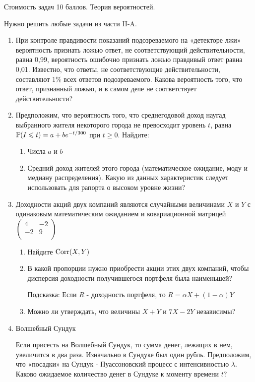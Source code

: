 \documentclass[12pt, a4paper]{article}\usepackage[]{graphicx}\usepackage[]{color}
\begin{document}
Стоимость задач 10 баллов. Теория вероятностей.

Нужно решить любые \textbf{} задачи из части II-A.

\begin{enumerate}
\item При контроле правдивости показаний подозреваемого на «детекторе лжи» вероятность признать ложью ответ, не соответствующий действительности, равна 0,99, вероятность ошибочно признать ложью правдивый ответ равна 0,01. Известно, что ответы, не соответствующие действительности, составляют 1\% всех ответов подозреваемого.
Какова вероятность того, что ответ, признанный ложью, и в самом деле не соответствует действительности?
\item Предположим, что вероятность того, что среднегодовой доход наугад выбранного жителя некоторого города не превосходит уровень $t$, равна $\P(I\le t)=a+be^{-t/300}$ при $t\ge 0$.
Найдите:
\begin{enumerate}
\item Числа $a$ и $b$
\item Средний доход жителей этого города (математическое ожидание, моду и медиану распределения). Какую из данных характеристик следует использовать для рапорта о высоком уровне жизни?
\end{enumerate}

\item Доходности акций двух компаний являются случайными величинами $X$ и $Y$ с одинаковым математическим ожиданием и ковариационной матрицей $\left( \begin{array}{cc}
   4 & -2  \\
   -2 & 9  \\
\end{array}\right)$
\begin{enumerate}
\item Найдите $\Corr(X,Y)$
\item В какой пропорции нужно приобрести акции этих двух компаний, чтобы дисперсия доходности получившегося портфеля была наименьшей?

Подсказка: Если $R$ - доходность портфеля, то $R=\alpha X+(1-\alpha)Y$
\item Можно ли утверждать, что величины $X+Y$ и $7X-2Y$ независимы?
\end{enumerate}

\item Волшебный Сундук

Если присесть на Волшебный Сундук, то сумма денег, лежащих в нем, увеличится в два раза. Изначально в Сундуке был один рубль. Предположим, что «посадки» на Сундук - Пуассоновский процесс с интенсивностью $\lambda$. Каково ожидаемое количество денег в Сундуке к моменту времени $t$?


\end{enumerate}
\end{document}
